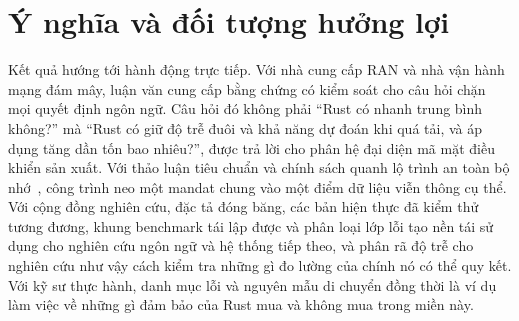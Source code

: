 \section{Ý nghĩa và đối tượng hưởng lợi}
Kết quả hướng tới hành động trực tiếp. Với nhà cung cấp RAN và nhà vận hành mạng đám mây,
luận văn cung cấp bằng chứng có kiểm soát cho câu hỏi chặn mọi quyết định ngôn ngữ. Câu hỏi
đó không phải ``Rust có nhanh trung bình không?'' mà ``Rust có giữ độ trễ đuôi và khả năng
dự đoán khi quá tải, và áp dụng tăng dần tốn bao nhiêu?'', được trả lời cho phân hệ đại diện
mã mặt điều khiển sản xuất. Với thảo luận tiêu chuẩn và chính sách quanh lộ trình an toàn bộ
nhớ~\cite{cisa2023memorysafe,oncd2024building}, công trình neo một mandat chung vào một điểm dữ
liệu viễn thông cụ thể. Với cộng đồng nghiên cứu, đặc tả đóng băng, các bản hiện thực đã kiểm
thử tương đương, khung benchmark tái lập được và phân loại lớp lỗi tạo nền tái sử dụng cho
nghiên cứu ngôn ngữ và hệ thống tiếp theo, và phân rã độ trễ cho nghiên cứu như vậy cách kiểm
tra những gì đo lường của chính nó có thể quy kết. Với kỹ sư thực hành, danh mục lỗi và nguyên
mẫu di chuyển đồng thời là ví dụ làm việc về những gì đảm bảo của Rust mua và không mua trong
miền này.
